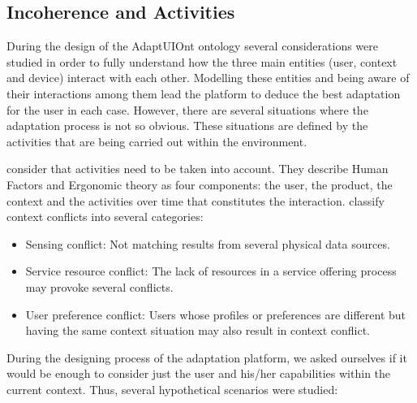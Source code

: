 

\subsection{Incoherence and Activities}
\label{sec:incoherence}

During the design of the AdaptUIOnt ontology several considerations were studied
in order to fully understand how the three main entities (user, context and device) 
interact with each other. Modelling these entities and being aware of their interactions
among them lead the platform to deduce the best adaptation for the user in each case.
However, there are several situations where the adaptation process is not so obvious.
These situations are defined by the activities that are being carried out within
the environment.

\citet{persad_characterising_2007}\citep{persad_cognitive_2007}
consider that activities need to be taken into account. They describe Human
Factors and Ergonomic theory as four components: the user, the product, the context
and the activities over time that constitutes the interaction.
\citet{hong_context_aware_2009} classify context conflicts into several categories:

\begin{itemize}
 \item Sensing conflict: Not matching results from several physical data sources.
 
 \item Service resource conflict: The lack of resources in a service offering
 process may provoke several conflicts.
 
 \item User preference conflict: Users whose profiles or preferences are different
 but having the same context situation may also result in context conflict.
\end{itemize}

During the designing process of the adaptation platform, we asked ourselves if 
it would be enough to consider just the user and his/her capabilities within the
current context. Thus, several hypothetical scenarios were studied:

